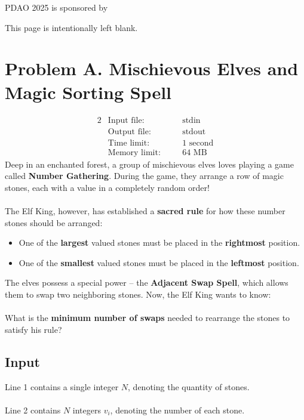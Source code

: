 \documentclass[12pt,a4paper]{article}
\newcommand*{\blankpage}{%
\newpage
\vspace*{\fill}
{\centering \huge This page is intentionally left blank.\par}
\vspace{\fill}
\newpage}
\begin{document}
\noindent\vfill
\begin{minipage}{0.97\textwidth}
 \noindent\hfill PDAO 2025 is sponsored by \textcopyright {}
\end{minipage}

\blankpage

\section*{\fontsize{18}{12}Problem A. Mischievous Elves and Magic Sorting Spell}

\begin{alignat*} {2}
 &   \text{Input file:}   \quad     &&\text{stdin}\\
 &   \text{Output file:}  \quad     &&\text{stdout}\\
 &   \text{Time limit:}   \quad     &&\text{1 second}\\
 &   \text{Memory limit:} \quad     &&\text{64 MB}
\end{alignat*}
\noindent
Deep in an enchanted forest, a group of mischievous elves loves playing a game called \textbf{Number Gathering}. During the game, they arrange a row of magic stones, each with a value in a completely random order!
\\\\
\noindent
The Elf King, however, has established a \textbf{sacred rule} for how these number stones should be arranged:

\begin{itemize}
    \item One of the \textbf{largest} valued stones must be placed in the \textbf{rightmost} position.
    \item One of the \textbf{smallest} valued stones must be placed in the \textbf{leftmost} position.
\end{itemize}

\noindent
The elves possess a special power -- the \textbf{Adjacent Swap Spell}, which allows them to swap two neighboring stones. Now, the Elf King wants to know:
\\\\
\noindent
What is the \textbf{minimum number of swaps} needed to rearrange the stones to satisfy his rule?

\subsection*{\fontsize{16}{12}Input}
Line 1 contains a single integer $N$, denoting the quantity of stones. \\\\
Line 2 contains $N$ integers $v_i$, denoting the number of each stone. 
\end{document}
